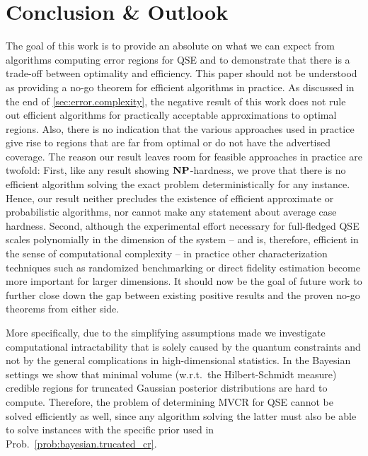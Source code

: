 \section{Conclusion \& Outlook}
\label{sec:error.outlook}

The goal of this work is to provide an absolute  on what we can expect from algorithms computing error regions for QSE and to demonstrate that there is a trade-off between optimality and efficiency.
This paper should not be understood as providing a no-go theorem for efficient algorithms in practice.
As discussed in the end of \cref{sec:error.complexity}, the negative result of this work does not rule out efficient algorithms for practically acceptable approximations to optimal regions.
Also, there is no indication that the various approaches used in practice give rise to regions that are far from optimal or do not have the advertised coverage.
The reason our result leaves room for feasible approaches in practice are twofold:
First, like any result showing $\mathbf{NP}$-hardness, we prove that there is no efficient algorithm solving the exact problem deterministically for any instance.
Hence, our result neither precludes the existence of efficient approximate or probabilistic algorithms, nor cannot make any statement about average case hardness.
Second, although the experimental effort necessary for full-fledged QSE scales polynomially in the dimension of the system -- and is, therefore, efficient in the sense of computational complexity -- in practice other characterization techniques such as randomized benchmarking or direct fidelity estimation become more important for larger dimensions.
It should now be the goal of future work to further close down the gap between existing positive results and the proven no-go theorems from either side.

More specifically, due to the simplifying assumptions made we investigate computational intractability that is solely caused by the quantum constraints and not by the general complications in high-dimensional statistics.
In the Bayesian settings we show that minimal volume (w.r.t.\ the Hilbert-Schmidt measure) credible regions for truncated Gaussian posterior distributions are hard to compute.
Therefore, the problem of determining MVCR for QSE cannot be solved efficiently as well, since any algorithm solving the latter must also be able to solve instances with the specific prior used in Prob.~\ref{prob:bayesian.trucated_cr}.

